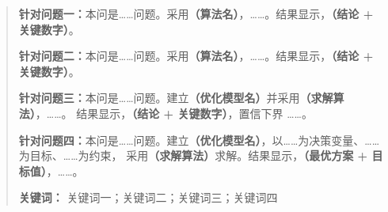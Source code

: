 %
%
%
%
%
\begin{abstract}

\textbf{针对问题一：}本问是……问题。采用\textbf{（算法名）}，……。结果显示，\textbf{（结论 + 关键数字）}。

\textbf{针对问题二：}本问是……问题。采用\textbf{（算法名）}，……。结果显示，\textbf{（结论 + 关键数字）}。

\textbf{针对问题三：}本问是……问题。建立\textbf{（优化模型名）}并采用\textbf{（求解算法）}，……。
结果显示，\textbf{（结论 + 关键数字）}，置信下界 ……。

\textbf{针对问题四：}本问是……问题。建立\textbf{（优化模型名）}，以……为决策变量、……为目标、……为约束，
采用\textbf{（求解算法）}求解。结果显示，\textbf{（最优方案 + 目标值）}，……。


\textbf{关键词：} 关键词一；关键词二；关键词三；关键词四
\end{abstract}
